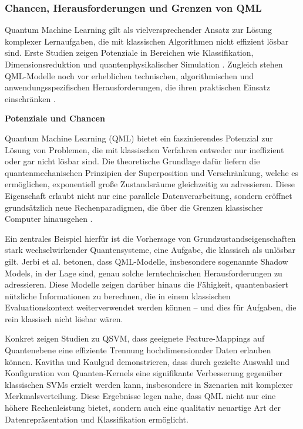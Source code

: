 \subsubsection{Chancen, Herausforderungen und Grenzen von QML}
Quantum Machine Learning gilt als vielversprechender Ansatz zur Lösung komplexer Lernaufgaben, die mit klassischen Algorithmen nicht effizient lösbar sind. Erste Studien zeigen Potenziale in Bereichen wie Klassifikation, Dimensionsreduktion und quantenphysikalischer Simulation \cite{jerbiShadowsQuantumMachine2024, peral-garciaSystematicLiteratureReview2024}. Zugleich stehen QML-Modelle noch vor erheblichen technischen, algorithmischen und anwendungsspezifischen Herausforderungen, die ihren praktischen Einsatz einschränken \cite{gujjuQuantumMachineLearning2024}.


\vspace{1em}
\noindent\textbf{Potenziale und Chancen}

\noindent
Quantum Machine Learning (QML) bietet ein faszinierendes Potenzial zur Lösung von Problemen, die mit klassischen Verfahren entweder nur ineffizient oder gar nicht lösbar sind. Die theoretische Grundlage dafür liefern die quantenmechanischen Prinzipien der Superposition und Verschränkung, welche es ermöglichen, exponentiell große Zustandsräume gleichzeitig zu adressieren. Diese Eigenschaft erlaubt nicht nur eine parallele Datenverarbeitung, sondern eröffnet grundsätzlich neue Rechenparadigmen, die über die Grenzen klassischer Computer hinausgehen \cite{peral-garciaSystematicLiteratureReview2024}.

Ein zentrales Beispiel hierfür ist die Vorhersage von Grundzustandseigenschaften stark wechselwirkender Quantensysteme, eine Aufgabe, die klassisch als unlösbar gilt. Jerbi et al. betonen, dass QML-Modelle, insbesondere sogenannte Shadow Models, in der Lage sind, genau solche lerntechnischen Herausforderungen zu adressieren. Diese Modelle zeigen darüber hinaus die Fähigkeit, quantenbasiert nützliche Informationen zu berechnen, die in einem klassischen Evaluationskontext weiterverwendet werden können – und dies für Aufgaben, die rein klassisch nicht lösbar wären. \cite{jerbiShadowsQuantumMachine2024}

Konkret zeigen Studien zu QSVM, dass geeignete Feature-Mappings auf Quantenebene eine effiziente Trennung hochdimensionaler Daten erlauben können. Kavitha und Kaulgud \cite{kavithaQuantumMachineLearning2024} demonstrieren, dass durch gezielte Auswahl und Konfiguration von Quanten-Kernels eine signifikante Verbesserung gegenüber klassischen SVMs erzielt werden kann, insbesondere in Szenarien mit komplexer Merkmalsverteilung. Diese Ergebnisse legen nahe, dass QML nicht nur eine höhere Rechenleistung bietet, sondern auch eine qualitativ neuartige Art der Datenrepräsentation und Klassifikation ermöglicht.

